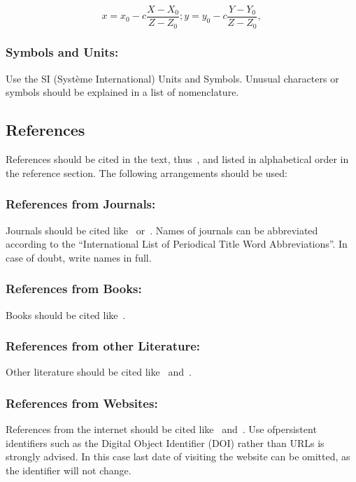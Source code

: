 \documentclass{isprs} %
\begin{document}
\begin{equation}\label{equ:1}
	x = x_0 -c \frac{X - X_0}{Z - Z_0}; y = y_0 -c \frac{Y - Y_0}{Z - Z_0},
\end{equation}


\subsubsection{Symbols and Units:}\label{sec:Symbols and Units}
Use the SI (Syst\`{e}me International) Units and Symbols. Unusual characters 
or symbols should be explained in a list of nomenclature.

\subsection{References}\label{sec:References}
References should be cited in the text, thus~\cite{smith1987rep}, and listed in alphabetical order in the reference section. The following arrangements should be used:

\subsubsection{References from Journals:} 
Journals should be cited like~\cite{smith1987} or~\cite{michalis2008}. Names of journals can be abbreviated according to the ``International List of Periodical Title Word Abbreviations''. In case of doubt, write names in full.

\subsubsection{References from Books:} 
Books should be cited like~\cite{foerstner2016}.

\subsubsection{References from other Literature:}
Other literature should be cited like~\cite{smith1987rep} and~\cite{smith2000}.

\subsubsection{References from Websites:}
References from the internet should be cited like~\cite{chan2017} and~\cite{maas2017}. Use ofpersistent identifiers such as the Digital Object Identifier (DOI) rather than URLs is strongly advised. In this case last date of visiting the website can be omitted, as the identifier will not change.
\end{document}
